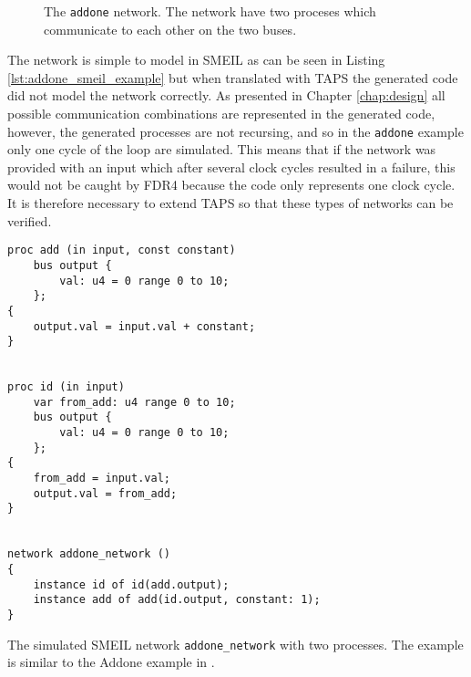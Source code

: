 \begin{figure}
    \centering
    \caption{The \texttt{addone} network. The network have two proceses which communicate to each other on the two buses.}
    \label{fig:addone_unclocked}
\end{figure}
The network is simple to model in SMEIL as can be seen in Listing \ref{lst:addone_smeil_example} but when translated with TAPS the generated \cspm{} code did not model the network correctly.
As presented in Chapter \ref{chap:design} all possible communication combinations are represented in the generated \cspm{} code, however, the generated \cspm{} processes are not recursing, and so in the \texttt{addone} example only one cycle of the loop are simulated. This means that if the network was provided with an input which after several clock cycles resulted in a failure, this would not be caught by FDR4 because the \cspm{} code only represents one clock cycle. It is therefore necessary to extend TAPS so that these types of networks can be verified.\\
\begin{listing}
\begin{verbatim}
proc add (in input, const constant)
    bus output {
        val: u4 = 0 range 0 to 10;
    };
{
    output.val = input.val + constant;
}


proc id (in input)
    var from_add: u4 range 0 to 10;
    bus output {
        val: u4 = 0 range 0 to 10;
    };
{
    from_add = input.val;
    output.val = from_add;
}


network addone_network ()
{
    instance id of id(add.output);
    instance add of add(id.output, constant: 1);
}
\end{verbatim}
\caption{The simulated SMEIL network \texttt{addone\_network} with two processes. The example is similar to the Addone example in \cite{smeil}.}
\label{lst:addone_smeil_example}
\end{listing}

